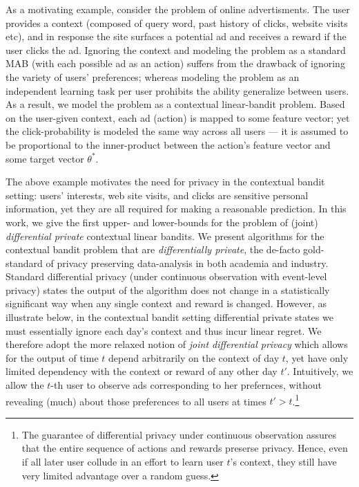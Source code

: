 \documentclass{article}
\begin{document}
As a motivating example, consider the problem of online advertisments. The user provides a context (composed of query word, past history of clicks, website visits etc), and in response the site surfaces a potential ad and receives a reward if the user clicks the ad. Ignoring the context and modeling the problem as a standard MAB (with each possible ad as an action) suffers from the drawback of ignoring the variety of users' preferences; whereas modeling the problem as an independent learning task per user prohibits the ability generalize between users. As a result, we model the problem as a contextual linear-bandit problem. Based on the user-given context, each ad (action) is mapped to some feature vector; yet the click-probability is modeled the same way across all users --- it is assumed to be proportional to the inner-product between the action's feature vector and some target vector $\theta^*$. 

The above example motivates the need for privacy in the contextual bandit setting: users' interests, web site visits, and clicks are
sensitive personal information, yet they are all required for making a reasonable prediction.  
In this work, we give the first upper- and lower-bounds for the problem of (joint) \emph{differential private} contextual linear bandits. We present algorithms for the contextual bandit problem that are
\emph{differentially private}, the de-facto gold-standard of privacy
preserving data-analysis in both academia and industry. Standard differential privacy (under continuous observation with event-level privacy) states the
output of the algorithm does not change in a statistically significant
way when any single context and reward is changed. However, as illustrate below, in the contextual bandit setting differential
private states we must essentially ignore each day's context and thus incur linear regret. We therefore adopt the
more relaxed notion of \emph{joint differential privacy}\cite{KearnsMechanismdesignlarge2014} which allows
for the output of time $t$ depend arbitrarily on the context of day $t$, yet have only limited dependency with the context or reward of any other day $t'$. Intuitively, we allow the $t$-th user to observe ads corresponding to her prefernces, without revealing (much) about those preferences to all users at times $t'>t$.\footnote{The guarantee of differential privacy under continuous observation assures that the entire sequence of actions and rewards preserse privacy. Hence, even if all later user collude in an effort to learn user $t$'s context, they still have very limited advantage over a random guess.}
\end{document}
